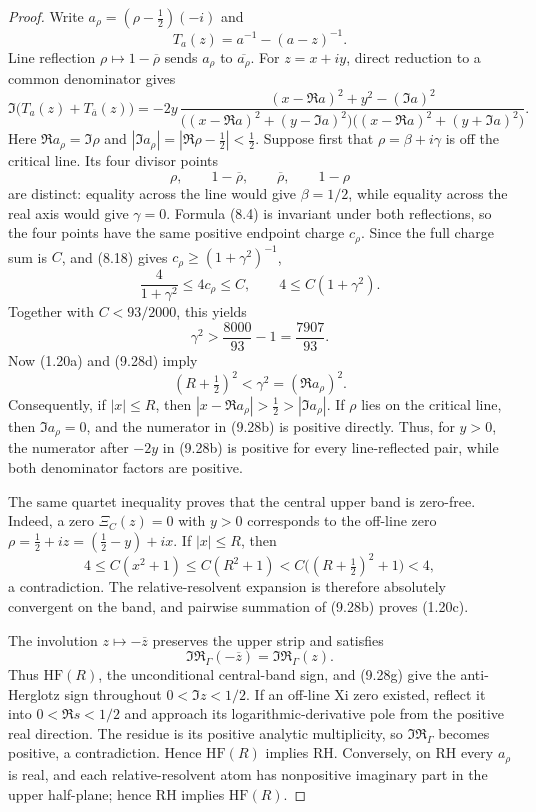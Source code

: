 \documentclass[11pt]{article}
\begin{document}
\begin{proof}
Write $a_\rho=(\rho-\frac12)(-i)$ and
\[
 T_a(z)=a^{-1}-(a-z)^{-1}.
\]
Line reflection $\rho\mapsto1-\overline\rho$ sends $a_\rho$ to
$\overline{a_\rho}$.  For $z=x+iy$, direct reduction to a common denominator gives
\[
 \Im\bigl(T_a(z)+T_{\overline a}(z)\bigr)
 =-2y\,
 \frac{(x-\Re a)^2+y^2-(\Im a)^2}
 {\bigl((x-\Re a)^2+(y-\Im a)^2\bigr)
  \bigl((x-\Re a)^2+(y+\Im a)^2\bigr)}.
 \tag{9.28b}
\]
Here $\Re a_\rho=\Im\rho$ and
$|\Im a_\rho|=|\Re\rho-\frac12|<\frac12$.  Suppose first that
$\rho=\beta+i\gamma$ is off the critical line.  Its four divisor points
\[
 \rho,\qquad 1-\overline\rho,\qquad \overline\rho,
 \qquad 1-\rho
 \tag{9.28c}
\]
are distinct: equality across the line would give $\beta=1/2$, while equality across the real
axis would give $\gamma=0$.  Formula \textup{(8.4)} is invariant under both reflections, so the
four points have the same positive endpoint charge $c_\rho$.  Since the full charge sum is $C$,
and \textup{(8.18)} gives $c_\rho\ge(1+\gamma^2)^{-1}$,
\[
 \frac4{1+\gamma^2}\le4c_\rho\le C,
 \qquad 4\le C(1+\gamma^2).
 \tag{9.28d}
\]
Together with $C<93/2000$, this yields
\[
 \gamma^2>\frac{8000}{93}-1=\frac{7907}{93}.
 \tag{9.28e}
\]
Now \textup{(1.20a)} and \textup{(9.28d)} imply
\[
 (R+\tfrac12)^2<\gamma^2=(\Re a_\rho)^2.
 \tag{9.28f}
\]
Consequently, if $|x|\le R$, then
$|x-\Re a_\rho|>\frac12>|\Im a_\rho|$.  If $\rho$ lies on the critical line, then
$\Im a_\rho=0$, and the numerator in \textup{(9.28b)} is positive directly.  Thus, for $y>0$,
the numerator after $-2y$ in \textup{(9.28b)} is positive for every line-reflected pair, while
both denominator factors are positive.

The same quartet inequality proves that the central upper band is zero-free.  Indeed, a zero
$\Xi_C(z)=0$ with $y>0$ corresponds to the off-line zero
$\rho=\frac12+iz=(\frac12-y)+ix$.  If $|x|\le R$, then
\[
 4\le C(x^2+1)\le C(R^2+1)
   <C\bigl((R+\tfrac12)^2+1\bigr)<4,
\]
a contradiction.  The relative-resolvent expansion is therefore absolutely convergent on the
band, and pairwise summation of \textup{(9.28b)} proves \textup{(1.20c)}.

The involution $z\mapsto-\overline z$ preserves the upper strip and satisfies
\[
 \Im\mathfrak R_\Gamma(-\overline z)=\Im\mathfrak R_\Gamma(z).
 \tag{9.28g}
\]
Thus $\mathrm{HF}(R)$, the unconditional central-band sign, and \textup{(9.28g)} give the
anti-Herglotz sign throughout $0<\Im z<1/2$.  If an off-line Xi zero existed, reflect it into
$0<\Re s<1/2$ and approach its logarithmic-derivative pole from the positive real direction.
The residue is its positive analytic multiplicity, so $\Im\mathfrak R_\Gamma$ becomes positive,
a contradiction.  Hence $\mathrm{HF}(R)$ implies RH.  Conversely, on RH every $a_\rho$ is real,
and each relative-resolvent atom has nonpositive imaginary part in the upper half-plane; hence RH
implies $\mathrm{HF}(R)$.


\end{proof}
\end{document}
